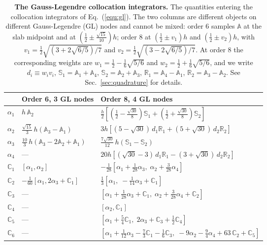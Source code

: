 \documentclass[final,5p,times,twocolumn,sort,compress]{elsarticle}
\makeatletter
\newcommand{\eq}{Eq.}
\DeclareRobustCommand{\_}{%
  \ifmmode\nfss@text{\textunderscore}\else\textunderscore\allowbreak\fi}
\newcommand{\equ}[1]{\eq~(\ref{equ:#1})}
\makeatother
\begin{document}
\begin{table}[t!]
 {\small
 \begin{tabular}{@{}l l l@{}}
  & Order 6, 3 GL nodes & Order 8, 4 GL nodes \\
 \hline
 $\alpha_1$ & $h\, \mathbb{A}_2$
            & $\frac{h}{2}\left[\left(\frac{1}{2} - \frac{\sqrt{30}}{8}\right)\mathbb{S}_1
              + \left(\frac{1}{2} + \frac{\sqrt{30}}{8}\right)\mathbb{S}_2\right]$ \\[2pt]
 $\alpha_2$ & $\frac{\sqrt{15}}{3}\, h \left(\mathbb{A}_3 - \mathbb{A}_1\right)$
            & $3h\left[(5 - \sqrt{30})\, d_1 \mathbb{R}_1 + (5 + \sqrt{30})\, d_2 \mathbb{R}_2\right]$ \\[2pt]
 $\alpha_3$ & $\frac{10}{3}\, h \left(\mathbb{A}_3 - 2\mathbb{A}_2 + \mathbb{A}_1\right)$
            & $\frac{7\sqrt{30}}{12}\, h \left(\mathbb{S}_1 - \mathbb{S}_2\right)$ \\[2pt]
 $\alpha_4$ & ---
            & $20h\left[(\sqrt{30} - 3)\, d_1 \mathbb{R}_1 - (3 + \sqrt{30})\, d_2 \mathbb{R}_2\right]$ \\
 \hline
 $\mathbb{C}_1$ & $\left[\alpha_1, \alpha_2\right]$
   & $-\frac{1}{28}\left[\alpha_1 + \frac{1}{28}\alpha_3 ,\; \alpha_2 + \frac{3}{28}\alpha_4\right]$ \\[2pt]
 $\mathbb{C}_2$ & $-\frac{1}{60}\left[\alpha_1, 2\alpha_3 + \mathbb{C}_1\right]$
   & $\frac{1}{3}\left[\alpha_1 ,\; -\frac{1}{14}\alpha_3 + \mathbb{C}_1\right]$ \\[2pt]
 $\mathbb{C}_3$ & ---
   & $\left[\alpha_1 + \frac{1}{28}\alpha_3 + \mathbb{C}_1 ,\; \alpha_2 + \frac{3}{28}\alpha_4 + \mathbb{C}_2\right]$ \\[2pt]
 $\mathbb{C}_4$ & --- & $\left[\alpha_2 , \mathbb{C}_1\right]$ \\[2pt]
 $\mathbb{C}_5$ & ---
   & $\left[\alpha_1 + \frac{5}{4}\mathbb{C}_1 ,\; 2\alpha_3 + \mathbb{C}_3 + \frac{1}{2}\mathbb{C}_4\right]$ \\[2pt]
 $\mathbb{C}_6$ & ---
   & $\left[\alpha_1 + \frac{1}{12}\alpha_3 - \frac{7}{3}\mathbb{C}_1 - \frac{1}{6}\mathbb{C}_3 ,\;
      -9\alpha_2 - \frac{9}{4}\alpha_4 + 63\,\mathbb{C}_2 + \mathbb{C}_5\right]$ \\
 \end{tabular}}
 \caption{\label{tab:collocation}\textbf{The Gauss-Legendre collocation integrators.} The quantities entering the collocation integrators of \equ{gl}. The two columns are different objects on different Gauss-Legendre (GL) nodes and cannot be mixed: order 6 samples $\mathbb{A}$ at the slab midpoint and at $(\frac{1}{2} \pm \frac{\sqrt{15}}{10})h$; order 8 at $(\frac{1}{2} \pm v_1)h$ and $(\frac{1}{2} \pm v_2)h$, with $v_1 = \frac{1}{2}\sqrt{(3 + 2\sqrt{6/5})/7}$ and $v_2 = \frac{1}{2}\sqrt{(3 - 2\sqrt{6/5})/7}$. At order 8 the corresponding weights are $w_1 = \frac{1}{2} - \frac{1}{6}\sqrt{5/6}$ and $w_2 = \frac{1}{2} + \frac{1}{6}\sqrt{5/6}$, and we write $d_i \equiv w_i v_i$, $\mathbb{S}_1 = \mathbb{A}_1 + \mathbb{A}_4$, $\mathbb{S}_2 = \mathbb{A}_2 + \mathbb{A}_3$, $\mathbb{R}_1 = \mathbb{A}_4 - \mathbb{A}_1$, $\mathbb{R}_2 = \mathbb{A}_3 - \mathbb{A}_2$. See Sec.~\ref{sec:quadrature} for details.}
\end{table}
\end{document}
